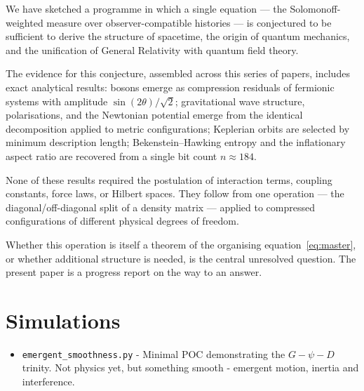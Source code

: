 \documentclass[11pt]{article}
\begin{document}
We have sketched a programme in which a single equation ---
the Solomonoff-weighted measure over observer-compatible histories ---
is conjectured to be sufficient to derive the structure of spacetime,
the origin of quantum mechanics, and the unification of General
Relativity with quantum field theory.

The evidence for this conjecture, assembled across this series of
papers, includes exact analytical results: bosons emerge as
compression residuals of fermionic systems with amplitude
$\sin(2\theta)/\sqrt{2}$; gravitational wave structure, polarisations,
and the Newtonian potential emerge from the identical decomposition
applied to metric configurations; Keplerian orbits are selected by
minimum description length; Bekenstein--Hawking entropy and the
inflationary aspect ratio are recovered from a single bit count
$n \approx 184$.

None of these results required the postulation of interaction terms,
coupling constants, force laws, or Hilbert spaces.
They follow from one operation --- the diagonal/off-diagonal split of a
density matrix --- applied to compressed configurations of different
physical degrees of freedom.

Whether this operation is itself a theorem of the organising
equation~\eqref{eq:master}, or whether additional structure is needed,
is the central unresolved question.
The present paper is a progress report on the way to an answer.

\section{Simulations}

\begin{itemize}
\item \texttt{emergent\_smoothness.py} - Minimal POC demonstrating the $G-\psi-D$ trinity. Not physics yet, but something smooth - emergent motion, inertia and interference.
\end{itemize}


\printbibliography
\end{document}
